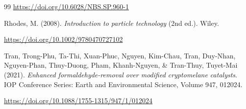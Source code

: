 \documentclass{article} %
\begin{document}
\begin{thebibliography}{99}
\url{https://doi.org/10.6028/NBS.SP.960-1}

Rhodes, M. (2008).  
\textit{Introduction to particle technology} (2nd ed.). Wiley.

\url{https://doi.org/10.1002/9780470727102}

Tran, Trong-Phu, Ta-Thi, Xuan-Phuc, Nguyen, Kim-Chau, Tran, Duy-Nhan, Nguyen-Phan, Thuy-Duong, Pham, Khanh-Nguyen, \& Tran-Thuy, Tuyet-Mai (2021). \textit{Enhanced formaldehyde-removal over modified cryptomelane catalysts}. IOP Conference Series: Earth and Environmental Science, Volume 947, 012024.

\url{https://doi.org/10.1088/1755-1315/947/1/012024}

\end{thebibliography}
\end{document}
